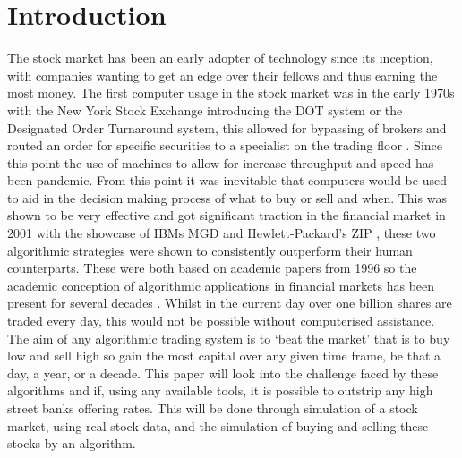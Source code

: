 \documentclass[12pt,a4paper]{article}
\begin{document}
\section{Introduction}

\iffalse
This section briefly introduces the general project background, the research question you are addressing, and the project objectives.  It should be between 2 to 3 pages in length.  Do not change the font sizes or line spacing in order to put in more text.

- Same as the aims just longer.\\
- What is the aim for a year?\\
- Objectives.\\
- What is the state of the art in the field?\\
- A bit of the history of trading.\\
\fi

The stock market has been an early adopter of technology since its inception, with companies wanting to get an edge over their fellows and thus earning the most money. The first computer usage in the stock market was in the early 1970s with the New York Stock Exchange introducing the DOT system or the Designated Order Turnaround system, this allowed for bypassing of brokers and routed an order for specific securities to a specialist on the trading floor \cite{Hasbrouck}. Since this point the use of machines to allow for increase throughput and speed has been pandemic. From this point it was inevitable that computers would be used to aid in the decision making process of what to buy or sell and when. This was shown to be very effective and got significant traction in the financial market in 2001 with the showcase of IBMs MGD and  Hewlett-Packard's ZIP \cite{Tesauro2001}, these two algorithmic strategies were shown to consistently outperform their human counterparts. These were both based on academic papers from 1996 so the academic conception of algorithmic applications in financial markets has been present for several decades\cite{Gjerstad1998} \cite{Cliff1998}. Whilst in the current day over one billion shares are traded every day, this would not be possible without computerised assistance. \\

The aim of any algorithmic trading system is to `beat the market' that is to buy low and sell high so gain the most capital over any given time frame, be that a day, a year, or a decade. This paper will look into the challenge faced by these algorithms and if, using any available tools, it is possible to outstrip any high street banks offering rates. This will be done through simulation of a stock market, using real stock data, and the simulation of buying and selling these stocks by an algorithm.\\
\end{document}

